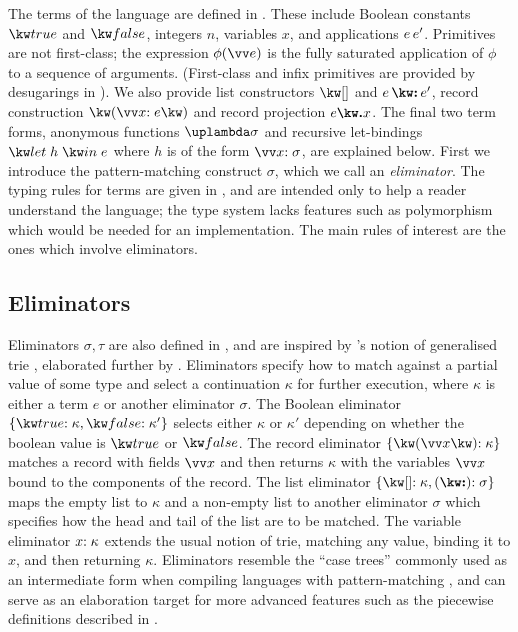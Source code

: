 The terms of the language are defined in . These include Boolean constants $\exTrue$ and $\exFalse$, integers $n$, variables $x$, and applications ${e}\,{e'}$. Primitives are not first-class; the expression $\exAppPrim{\phi}{\vec{e}}$ is the fully saturated application of $\phi$ to a sequence of arguments. (First-class and infix primitives are provided by desugarings in ). We also provide list constructors $\exNil$ and $\exCons{e}{e'}$, record construction $\exRec{\vec{\bind{x}{e}}}$ and record projection $\exRecProj{e}{x}$. The final two term forms, anonymous functions $\exLambda{\sigma}$ and recursive let-bindings $\exLetRecMutual{h}{e}$ where $h$ is of the form $\vec{\bind{x}{\sigma}}$, are explained below. First we introduce the pattern-matching construct $\sigma$, which we call an \emph{eliminator}. The typing rules for terms are given in , and are intended only to help a reader understand the language; the type system lacks features such as polymorphism which would be needed for an implementation. The main rules of interest are the ones which involve eliminators.

\subsection{Eliminators}
\label{sec:core-language:syntax-eliminator}

Eliminators $\sigma, \tau$ are also defined in , and are inspired by \citeauthor{connelly95}'s notion of generalised trie \cite{connelly95}, elaborated further by \citet{hinze00}. Eliminators specify how to match against a partial value of some type and select a continuation $\kappa$ for further execution, where $\kappa$ is either a term $e$ or another eliminator $\sigma$. The Boolean eliminator $\elimBool{\kappa}{\kappa'}$ selects either $\kappa$ or $\kappa'$ depending on whether the boolean value is $\exTrue$ or $\exFalse$. The record eliminator $\elimRec{\seq{x}}{\kappa}$ matches a record with fields $\seq{x}$ and then returns $\kappa$ with the variables $\seq{x}$ bound to the components of the record. The list eliminator $\elimList{\kappa}{\sigma}$ maps the empty list to $\kappa$ and a non-empty list to another eliminator $\sigma$ which specifies how the head and tail of the list are to be matched. The variable eliminator ${x}{:}\;{\kappa}$ extends the usual notion of trie, matching any value, binding it to $x$, and then returning $\kappa$. Eliminators resemble the ``case trees'' commonly used as an intermediate form when compiling languages with pattern-matching \cite{graf20}, and can serve as an elaboration target for more advanced features such as the piecewise definitions described in . 


